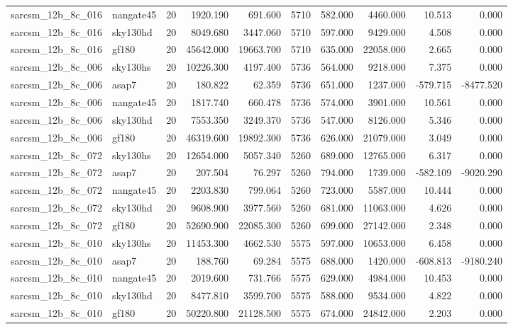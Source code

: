 \begin{longtable}{llrrrrrrrr}
sarcsm\_12b\_8c\_016 & nangate45 & 20 & 1920.190 & 691.600 & 5710 & 582.000 & 4460.000 & 10.513 & 0.000 \\
sarcsm\_12b\_8c\_016 & sky130hd & 20 & 8049.680 & 3447.060 & 5710 & 597.000 & 9429.000 & 4.508 & 0.000 \\
sarcsm\_12b\_8c\_016 & gf180 & 20 & 45642.000 & 19663.700 & 5710 & 635.000 & 22058.000 & 2.665 & 0.000 \\
sarcsm\_12b\_8c\_006 & sky130hs & 20 & 10226.300 & 4197.400 & 5736 & 564.000 & 9218.000 & 7.375 & 0.000 \\
sarcsm\_12b\_8c\_006 & asap7 & 20 & 180.822 & 62.359 & 5736 & 651.000 & 1237.000 & -579.715 & -8477.520 \\
sarcsm\_12b\_8c\_006 & nangate45 & 20 & 1817.740 & 660.478 & 5736 & 574.000 & 3901.000 & 10.561 & 0.000 \\
sarcsm\_12b\_8c\_006 & sky130hd & 20 & 7553.350 & 3249.370 & 5736 & 547.000 & 8126.000 & 5.346 & 0.000 \\
sarcsm\_12b\_8c\_006 & gf180 & 20 & 46319.600 & 19892.300 & 5736 & 626.000 & 21079.000 & 3.049 & 0.000 \\
sarcsm\_12b\_8c\_072 & sky130hs & 20 & 12654.000 & 5057.340 & 5260 & 689.000 & 12765.000 & 6.317 & 0.000 \\
sarcsm\_12b\_8c\_072 & asap7 & 20 & 207.504 & 76.297 & 5260 & 794.000 & 1739.000 & -582.109 & -9020.290 \\
sarcsm\_12b\_8c\_072 & nangate45 & 20 & 2203.830 & 799.064 & 5260 & 723.000 & 5587.000 & 10.444 & 0.000 \\
sarcsm\_12b\_8c\_072 & sky130hd & 20 & 9608.900 & 3977.560 & 5260 & 681.000 & 11063.000 & 4.626 & 0.000 \\
sarcsm\_12b\_8c\_072 & gf180 & 20 & 52690.900 & 22085.300 & 5260 & 699.000 & 27142.000 & 2.348 & 0.000 \\
sarcsm\_12b\_8c\_010 & sky130hs & 20 & 11453.300 & 4662.530 & 5575 & 597.000 & 10653.000 & 6.458 & 0.000 \\
sarcsm\_12b\_8c\_010 & asap7 & 20 & 188.760 & 69.284 & 5575 & 688.000 & 1420.000 & -608.813 & -9180.240 \\
sarcsm\_12b\_8c\_010 & nangate45 & 20 & 2019.600 & 731.766 & 5575 & 629.000 & 4984.000 & 10.453 & 0.000 \\
sarcsm\_12b\_8c\_010 & sky130hd & 20 & 8477.810 & 3599.700 & 5575 & 588.000 & 9534.000 & 4.822 & 0.000 \\
sarcsm\_12b\_8c\_010 & gf180 & 20 & 50220.800 & 21128.500 & 5575 & 674.000 & 24842.000 & 2.203 & 0.000 \\

\end{longtable}

